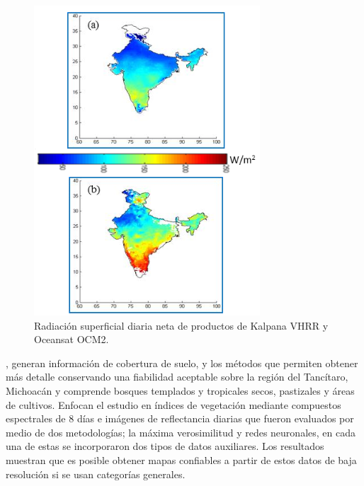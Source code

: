 \begin{figure}[htb]
  \centering 
  \includegraphics[scale=0.7]{pictures/ER6.png}
  \caption{ Radiación superficial diaria neta de productos de Kalpana VHRR y Oceansat OCM2.} 
  \label{fig:er6}
\end{figure}
\newpage
\cite{mas2011aplicaciones},\cite{ garcia2011evaluacion} generan información de cobertura de suelo, y los métodos que permiten obtener más detalle conservando una fiabilidad 
aceptable sobre la región del Tancítaro, Michoacán y comprende bosques templados y tropicales secos, pastizales y áreas 
de cultivos. Enfocan el estudio en índices de vegetación mediante compuestos espectrales de 8 días e imágenes de reflectancia diarias que 
fueron evaluados por medio de dos metodologías; la máxima verosimilitud y redes neuronales, en cada una de estas se incorporaron 
dos tipos de datos auxiliares. Los resultados muestran que es posible obtener mapas confiables a partir de estos datos de baja resolución 
si se usan categorías generales.

